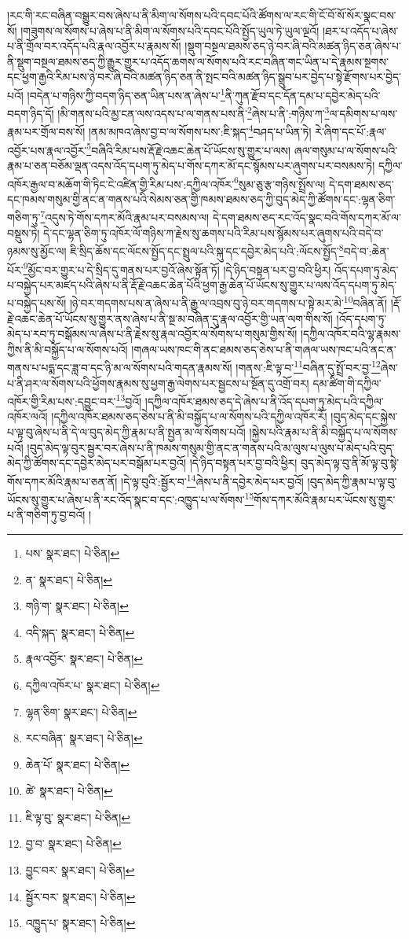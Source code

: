 །རང་གི་རང་བཞིན་བསྒྱུར་བས་ཞེས་པ་ནི་མིག་ལ་སོགས་པའི་དབང་པོའི་ཚོགས་ལ་རང་གི་ངོ་བོ་སོ་སོར་སྣང་བས་སོ། །གཟུགས་ལ་སོགས་པ་ཞེས་པ་ནི་མིག་ལ་སོགས་པའི་དབང་པོའི་སྤྱོད་ཡུལ་ཏེ་ཡུལ་ལྔའོ། །ཐར་པ་འདོད་པ་ཞེས་པ་ནི་གྲོལ་བར་འདོད་པའི་རྣལ་འབྱོར་པ་རྣམས་སོ། །སྡུག་བསྔལ་ཐམས་ཅད་ཉེ་བར་ཞི་བའི་མཚན་ཉིད་ཅན་ཞེས་པ་ནི་སྡུག་བསྔལ་ཐམས་ཅད་ཀྱི་རྒྱུར་གྱུར་པ་འདོད་ཆགས་ལ་སོགས་པའི་རང་བཞིན་གང་ཡིན་པ་དེ་རྣམས་སྔགས་དང་ཕྱག་རྒྱའི་རིམ་པས་ཉེ་བར་ཞི་བའི་མཚན་ཉིད་ཅན་ནི་སྤང་བའི་མཚན་ཉིད་སྒྲུབ་པར་བྱེད་པ་སྟེ་རྫོགས་པར་བྱེད་པའོ། །བདེན་པ་གཉིས་ཀྱི་བདག་ཉིད་ཅན་ཡིན་པས་ན་ཞེས་པ་\footnote{པས་  སྣར་ཐང་།  པེ་ཅིན། }ནི་ཀུན་རྫོབ་དང་དོན་དམ་པ་དབྱེར་མེད་པའི་བདག་ཉིད་དོ། །མི་གནས་པའི་མྱ་ངན་ལས་འདས་པ་ལ་གནས་པས་ནི་\footnote{ན་  སྣར་ཐང་།  པེ་ཅིན། }ཞེས་པ་ནི་:གཉིས་ཀ་\footnote{གཉི་ག་  སྣར་ཐང་།  པེ་ཅིན། }ལ་དམིགས་པ་ལས་རྣམ་པར་གྲོལ་བས་སོ། །ནམ་མཁའ་ཞེས་བྱ་བ་ལ་སོགས་པས་:ཇི་སྐད་\footnote{འདི་སྐད་  སྣར་ཐང་།  པེ་ཅིན། }བཤད་པ་ཡིན་ཏེ། རེ་ཞིག་དང་པོ་:རྣལ་འབྱོར་པས་རྣལ་འབྱོར་\footnote{རྣལ་འབྱོར་  སྣར་ཐང་།  པེ་ཅིན། }བཞིའི་རིམ་པས་རྡོ་རྗེ་འཆང་ཆེན་པོ་ཡོངས་སུ་གྱུར་པ་ལས། ཞལ་གསུམ་པ་ལ་སོགས་པའི་རྣམ་པ་ཅན་བཅོམ་ལྡན་འདས་འོད་དཔག་ཏུ་མེད་པ་གོས་དཀར་མོ་དང་སྙོམས་པར་ཞུགས་པར་བསམས་ཏེ། དཀྱིལ་འཁོར་རྒྱལ་བ་མཆོག་གི་ཏིང་ངེ་འཛིན་གྱི་རིམ་པས་:དཀྱིལ་འཁོར་\footnote{དཀྱིལ་འཁོར་པ་  སྣར་ཐང་།  པེ་ཅིན། }སུམ་ཅུ་རྩ་གཉིས་སྤྲོས་ལ། དེ་དག་ཐམས་ཅད་དང་ཁམས་གསུམ་གྱི་ནང་ན་གནས་པའི་སེམས་ཅན་གྱི་ཁམས་ཐམས་ཅད་ཀྱི་བུད་མེད་ཀྱི་ཚོགས་དང་:ལྷན་ཅིག་གཅིག་ཏུ་\footnote{ལྷན་ཅིག་  སྣར་ཐང་།  པེ་ཅིན། }འདུས་ཏེ་གོས་དཀར་མོའི་རྣམ་པར་བསམས་ལ། དེ་དག་ཐམས་ཅད་རང་འོད་སྣང་བའི་གོས་དཀར་མོ་ལ་བསྡུས་ཏེ། དེ་དང་ལྷན་ཅིག་ཏུ་འཁོར་ལོ་གཉིས་ཀ་རྗེས་སུ་ཆགས་པའི་རིམ་པས་སྙོམས་པར་ཞུགས་པའི་བདེ་བ་ཉམས་སུ་མྱོང་ལ། ཇི་སྲིད་ཆོས་དང་ལོངས་སྤྱོད་དང་སྤྲུལ་པའི་སྐུ་དང་དབྱེར་མེད་པའི་:ལོངས་སྤྱོད་\footnote{རང་བཞིན་  སྣར་ཐང་།  པེ་ཅིན། }བདེ་བ་:ཆེན་པོར་\footnote{ཆེན་པོ་  སྣར་ཐང་།  པེ་ཅིན། }མྱོང་བར་གྱུར་པ་དེ་སྲིད་དུ་གནས་པར་བྱའོ་ཞེས་སྟོན་ཏོ། །དེ་ཉིད་བསྟན་པར་བྱ་བའི་ཕྱིར། འོད་དཔག་ཏུ་མེད་པ་བསྐྱེད་པར་མཛད་པའི་ཞེས་པ་ནི་རྡོ་རྗེ་འཆང་ཆེན་པོའི་ཕྱག་རྒྱ་ཆེན་པོ་ཡོངས་སུ་གྱུར་པ་ལས་འོད་དཔག་ཏུ་མེད་པ་བསྐྱེད་པས་སོ། །ཉེ་བར་གདགས་པས་ན་ཞེས་པ་ནི་རྒྱུ་ལ་འབྲས་བུ་ཉེ་བར་གདགས་པ་སྟེ་མར་མེ་\footnote{ཚེ་  སྣར་ཐང་།  པེ་ཅིན། }བཞིན་ནོ། །རྡོ་རྗེ་འཆང་ཆེན་པོ་ཡོངས་སུ་གྱུར་ནས་ཞེས་པ་ནི་སྔ་མ་བཞིན་དུ་རྣལ་འབྱོར་གྱི་ཡན་ལག་གིས་སོ། །འོད་དཔག་ཏུ་མེད་པ་རབ་ཏུ་བསྒོམས་ལ་ཞེས་པ་ནི་རྗེས་སུ་རྣལ་འབྱོར་ལ་སོགས་པ་གསུམ་གྱིས་སོ། །དཀྱིལ་འཁོར་བའི་ལྷ་རྣམས་ཀྱིས་ནི་མི་བསྐྱོད་པ་ལ་སོགས་པའོ། །གཞལ་ཡས་ཁང་གི་ནང་ཐམས་ཅད་ཅེས་པ་ནི་གཞལ་ཡས་ཁང་པའི་ནང་ན་གནས་པ་པདྨ་དང་ཟླ་བ་དང་ཉི་མ་ལ་སོགས་པའི་གདན་རྣམས་སོ། །གནས་:ཇི་ལྟ་བ་\footnote{ཇི་ལྟ་བུ་  སྣར་ཐང་།  པེ་ཅིན། }བཞིན་དུ་སྤྲོ་བར་བྱ་\footnote{བྱ་བ་  སྣར་ཐང་།  པེ་ཅིན། }ཞེས་པ་ནི་ཤར་ལ་སོགས་པའི་ཕྱོགས་རྣམས་སུ་ཕྱག་རྒྱ་ལེགས་པར་སྦྱངས་པ་སྔོན་དུ་འགྲོ་བར། དམ་ཚིག་གི་དཀྱིལ་འཁོར་གྱི་རིམ་པས་:དབྱུང་བར་\footnote{བྱུང་བར་  སྣར་ཐང་།  པེ་ཅིན། }བྱའོ། །དཀྱིལ་འཁོར་ཐམས་ཅད་དེ་ཞེས་པ་ནི་འོད་དཔག་ཏུ་མེད་པའི་དཀྱིལ་འཁོར་ལའོ། །དཀྱིལ་འཁོར་ཐམས་ཅད་ཅེས་པ་ནི་མི་བསྐྱོད་པ་ལ་སོགས་པའི་དཀྱིལ་འཁོར་རོ། །བུད་མེད་དང་སྐྱེས་པ་ལྟ་བུ་ཞེས་པ་ནི་དེ་ལ་བུད་མེད་ཀྱི་རྣམ་པ་ནི་སྤྱན་མ་ལ་སོགས་པའོ། །སྐྱེས་པའི་རྣམ་པ་ནི་མི་བསྐྱོད་པ་ལ་སོགས་པའོ། །བུད་མེད་ལྟ་བུར་སྦྱར་བར་ཞེས་པ་ནི་ཁམས་གསུམ་གྱི་ནང་ན་གནས་པའི་མ་ལུས་པ་ལུས་པ་མེད་པའི་བུད་མེད་ཀྱི་ཚོགས་དང་དབྱེར་མེད་པར་བསྒོམ་པར་བྱའོ། །དེ་ཉིད་བསྟན་པར་བྱ་བའི་ཕྱིར། བུད་མེད་ལྟ་བུ་ནི་མོ་ལྟ་བུ་སྟེ་གོས་དཀར་མོའི་རྣམ་པ་ཅན་ནོ། །དེ་ལྟ་བུའི་:སྦྱོར་བ་\footnote{སྦྱོར་བར་  སྣར་ཐང་།  པེ་ཅིན། }ཞེས་པ་ནི་དབྱེར་མེད་པར་བྱའོ། །བུད་མེད་ཀྱི་རྣམ་པ་ལྟ་བུ་ཡོངས་སུ་གྱུར་པ་ཞེས་པ་ནི་རང་འོད་སྣང་བ་དང་:འཁྱུད་པ་ལ་སོགས་\footnote{འཁྱུད་པ་  སྣར་ཐང་།  པེ་ཅིན། }གོས་དཀར་མོའི་རྣམ་པར་ཡོངས་སུ་གྱུར་པ་ནི་གཅིག་ཏུ་བྱ་བའོ། །
